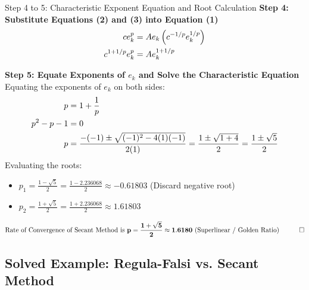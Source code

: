 \documentclass[11pt,a4paper]{article}
\begin{document}
\begin{exbox}{Step 4 to 5: Characteristic Exponent Equation and Root Calculation}
\textbf{Step 4: Substitute Equations (2) and (3) into Equation (1)}
\begin{align}
    c e_k^p &= A e_k \left( c^{-1/p} e_k^{1/p} \right) \notag \\
    c^{1 + 1/p} e_k^p &= A e_k^{1 + 1/p}
\end{align}

\textbf{Step 5: Equate Exponents of $e_k$ and Solve the Characteristic Equation}
Equating the exponents of $e_k$ on both sides:
\begin{align}
    p &= 1 + \frac{1}{p} \notag \\
    p^2 - p - 1 &= 0 \notag \\
    p &= \frac{-(-1) \pm \sqrt{(-1)^2 - 4(1)(-1)}}{2(1)} = \frac{1 \pm \sqrt{1 + 4}}{2} = \frac{1 \pm \sqrt{5}}{2}
\end{align}
Evaluating the roots:
\begin{itemize}
    \item $p_1 = \frac{1 - \sqrt{5}}{2} = \frac{1 - 2.236068}{2} \approx -0.61803$ (Discard negative root)
    \item $p_2 = \frac{1 + \sqrt{5}}{2} = \frac{1 + 2.236068}{2} \approx \mathbf{1.61803}$
\end{itemize}
$$\mathbf{\text{Rate of Convergence of Secant Method is } p = \frac{1+\sqrt{5}}{2} \approx 1.6180 \text{ (Superlinear / Golden Ratio)}} \quad \qed$$
\end{exbox}

\newpage

\subsection{Solved Example: Regula-Falsi vs. Secant Method}
\end{document}
